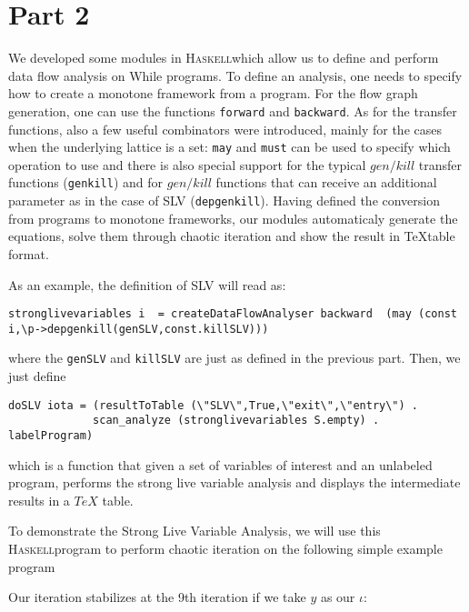 \documentclass[a4wide,12pt]{article}
\def\hs#1{\texttt{#1}}
\def\haskell{\textsc{Haskell}}
\def\program#1{\fbox{\begin{minipage}{0.5\textwidth}\protect{$\begin{array}{ll} #1 \end{array}$}\end{minipage}}}
\begin{document}
 
\section{Part 2}
 
We developed some modules in \haskell which allow us to define and perform
data flow analysis on While programs. To define an analysis,
one needs to specify how to create a monotone framework from a program.
For the flow graph generation, one can use the functions \hs{forward} and \hs{backward}.
As for the transfer functions, also a few useful combinators were introduced, mainly
for the cases when the underlying lattice is a set: \hs{may} and \hs{must}
can be used to specify which operation to use and there is also special support
for the typical $gen/kill$ transfer functions (\hs{genkill}) and for
$gen/kill$ functions that can receive an additional parameter as in the case of SLV
(\hs{depgenkill}). Having defined the conversion from programs to monotone frameworks,
our modules automaticaly generate the equations, solve them through chaotic iteration
and show the result in \TeX table format. 

As an example, the definition of SLV will read as:

{\small
\begin{verbatim}
stronglivevariables i  = createDataFlowAnalyser backward  (may (const i,\p->depgenkill(genSLV,const.killSLV)))
\end{verbatim}
}

\noindent
where the \hs{genSLV} and \hs{killSLV} are just as defined in the previous part. Then, we just define

{\small
\begin{verbatim}
doSLV iota = (resultToTable (\"SLV\",True,\"exit\",\"entry\") .
             scan_analyze (stronglivevariables S.empty) . labelProgram)
\end{verbatim}
}

\noindent
which is a function that given a set of variables of interest
and an unlabeled program, performs the strong live variable analysis and displays
the intermediate results in a $TeX$ table.


To demonstrate the Strong Live Variable Analysis, we will use this \haskell program
to perform chaotic iteration on the following simple example program

\program{}
 
Our iteration stabilizes at the 9th iteration if we take $y$ as our $\iota$:
 
\end{document}
